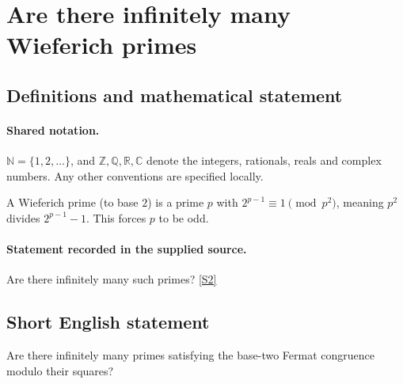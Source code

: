 \documentclass[11pt]{article}
\newcommand{\sref}[2]{\hyperlink{source:#1:#2}{[S#2]}}
\begin{document}
\section{Are there infinitely many Wieferich primes}\label{statement}

\subsection{Definitions and mathematical statement}

\paragraph{Shared notation.}$\mathbb N=\{1,2,\ldots\}$, and $\mathbb Z,\mathbb Q,\mathbb R,\mathbb C$ denote the integers, rationals, reals and complex numbers. Any other conventions are specified locally.


A Wieferich prime (to base $2$) is a prime $p$ with $2^{p-1}\equiv1\pmod{p^2}$, meaning $p^2$ divides $2^{p-1}-1$. This forces $p$ to be odd.
\paragraph{Statement recorded in the supplied source.}
Are there infinitely many such primes? \sref{statement}{2}
\subsection{Short English statement}
Are there infinitely many primes satisfying the base-two Fermat congruence modulo their squares?
\end{document}
